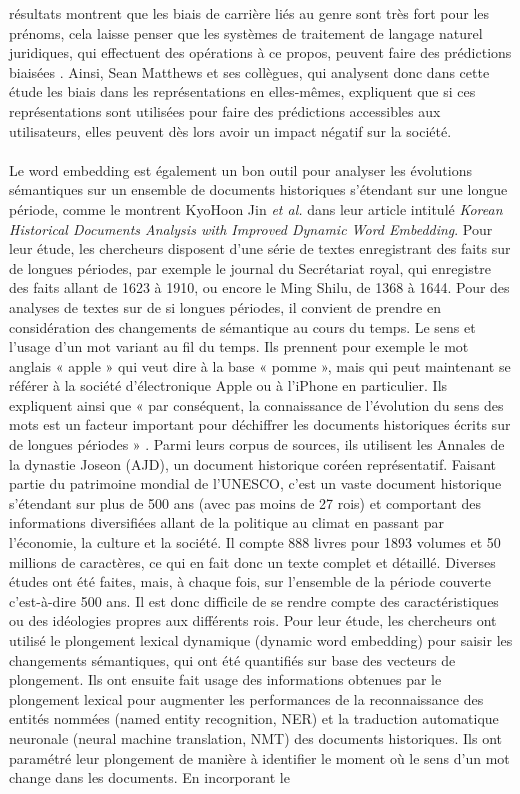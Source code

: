 \documentclass{article}
\begin{document}
résultats montrent que les biais de carrière liés au genre sont très fort pour les prénoms, cela laisse penser que les systèmes de traitement de langage naturel juridiques, qui effectuent des opérations à ce propos, peuvent faire des prédictions biaisées \cite{matthews2022gender}. Ainsi, Sean Matthews et ses collègues, qui analysent donc dans cette étude les biais dans les représentations en elles-mêmes, expliquent que si ces représentations sont utilisées pour faire des prédictions accessibles aux utilisateurs, elles peuvent dès lors avoir un impact négatif sur la société. 
\paragraph{}
Le word embedding est également un bon outil pour analyser les évolutions sémantiques sur un ensemble de documents historiques s’étendant sur une longue période, comme le montrent KyoHoon Jin \textit{et al.} dans leur article intitulé \textit{Korean Historical Documents Analysis with Improved Dynamic Word Embedding}. Pour leur étude, les chercheurs disposent d’une série de textes enregistrant des faits sur de longues périodes, par exemple le journal du Secrétariat royal, qui enregistre des faits allant de 1623 à 1910, ou encore le Ming Shilu, de 1368 à 1644. Pour des analyses de textes sur de si longues périodes, il convient de prendre en considération des changements de sémantique au cours du temps. Le sens et l’usage d’un mot variant au fil du temps. Ils prennent pour exemple le mot anglais « apple » qui veut dire à la base « pomme », mais qui peut maintenant se référer à la société d’électronique Apple ou à l’iPhone en particulier. Ils expliquent ainsi que « par conséquent, la connaissance de l'évolution du sens des mots est un facteur important pour déchiffrer les documents historiques écrits sur de longues périodes » \cite{jin2020korean}. Parmi leurs corpus de sources, ils utilisent les Annales de la dynastie Joseon (AJD), un document historique coréen représentatif. Faisant partie du patrimoine mondial de l’UNESCO, c’est un vaste document historique s’étendant sur plus de 500 ans (avec pas moins de 27 rois) et comportant des informations diversifiées allant de la politique au climat en passant par l’économie, la culture et la société. Il compte 888 livres pour 1893 volumes et 50 millions de caractères, ce qui en fait donc un texte complet et détaillé. Diverses études ont été faites, mais, à chaque fois, sur l’ensemble de la période couverte c’est-à-dire 500 ans. Il est donc difficile de se rendre compte des caractéristiques ou des idéologies propres aux différents rois. Pour leur étude, les chercheurs ont utilisé le plongement lexical dynamique (dynamic word embedding) pour saisir les changements sémantiques, qui ont été quantifiés sur base des vecteurs de plongement. Ils ont ensuite fait usage des informations obtenues par le plongement lexical pour augmenter les performances de la reconnaissance des entités nommées (named entity recognition, NER) et la traduction automatique neuronale (neural machine translation, NMT) des documents historiques. Ils ont paramétré leur plongement de manière à identifier le moment où le sens d’un mot change dans les documents. En incorporant le 
\end{document}
